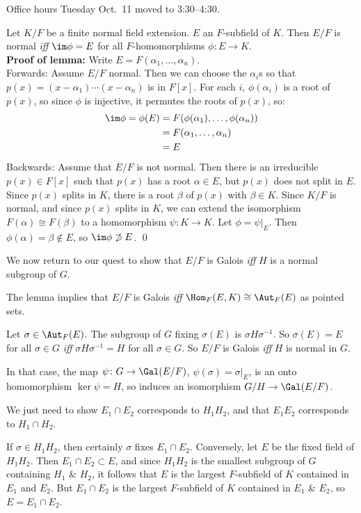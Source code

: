 Office hours Tuesday Oct.~11 moved to 3:30--4:30.

\lem Let $K/F$ be a finite normal field extension.  %
$E$ an $F$-subfield of $K$.  Then $E/F$ is normal \emph{iff} $\im\phi=E$ for all $F$-homomorphisms $\phi\colon E\to K$. \\
\textbf{Proof of lemma: }Write $E=F(\alpha_1,\dotsc,\alpha_n)$. \\
Forwards: Assume $E/F$ normal.  Then we can choose the $\alpha_i$s so that $p(x)=(x-\alpha_1)\dotsm(x-\alpha_n)$ is in $F[x]$.  For each $i$, $\phi(\alpha_i)$ is a root of $p(x)$, so since $\phi$ is injective, it permutes the roots of $p(x)$, so:
\begin{align*}
\im\phi = \phi(E) &= F(\phi(\alpha_1),\dotsc,\phi(\alpha_n)) \\
&= F(\alpha_1,\dotsc,\alpha_n) \\
&= E
\end{align*}
Backwards: Assume that $E/F$ is not normal.  Then there is an irreducible $p(x)\in F[x]$ such that $p(x)$ has a root $\alpha\in E$, but $p(x)$ does not split in $E$.  Since $p(x)$ splits in $K$, there is a root $\beta$ of $p(x)$ with $\beta\in K$.  Since $K/F$ is normal, and since $p(x)$ splits in $K$, we can extend the isomorphism $F(\alpha)\cong F(\beta)$ to a homomorphism $\psi\colon K\to K$.  Let $\phi=\psi|_E$.  Then $\phi(\alpha)=\beta\notin E$, so $\im\phi\not\supset E$. \qed

We now return to our quest to show that $E/F$ is Galois \emph{iff} $H$ is a normal subgroup of $G$.

The lemma implies that $E/F$ is Galois \emph{iff} $\Hom_F(E,K)\cong\Aut_F(E)$ as pointed sets.

Let $\sigma\in\Aut_F(E)$.  The subgroup of $G$ fixing $\sigma(E)$ is $\sigma H\sigma^{-1}$.  So $\sigma(E)=E$ for all $\sigma\in G$ \emph{iff} $\sigma H\sigma^{-1}=H$ for all $\sigma\in G$.  So $E/F$ is Galois \emph{iff} $H$ is normal in $G$.

In that case, the map $\psi\colon G\to\Gal(E/F)$, $\psi(\sigma)=\sigma|_E$, is an onto homomorphism $\ker\psi=H$, so induces an isomorphism $G/H\to\Gal(E/F)$.

We just need to show $E_1\cap E_2$ corresponds to $H_1H_2$, and that $E_1E_2$ corresponds to $H_1\cap H_2$.

If $\sigma\in H_1H_2$, then certainly $\sigma$ fixes $E_1\cap E_2$.  Conversely, let $E$ be the fixed field of $H_1H_2$.  Then $E_1\cap E_2\subset E$, and since $H_1H_2$ is the smallest subgroup of $G$ containing $H_1$ \& $H_2$, it follows that $E$ is the largest $F$-subfield of $K$ contained in $E_1$ and $E_2$.  But $E_1\cap E_2$ is the largest $F$-subfield of $K$ contained in $E_1$ \& $E_2$, so $E=E_1\cap E_2$.

